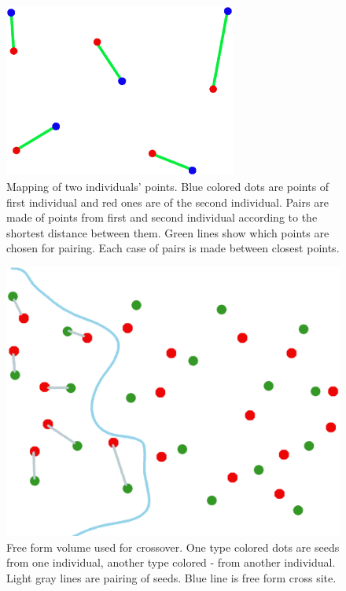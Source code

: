 \documentclass[12pt]{report}
\begin{document}
\begin{figure}
    \centering
    \includegraphics[width=3.0in]{individuals_map}
    \caption{Mapping of two individuals' points. Blue colored dots are points of first individual and red ones are of the second individual. Pairs are made of points from first and second individual according to the shortest distance between them. Green lines show which points are chosen for pairing. Each case of pairs is made between closest points.}
    \label{mappingindividuals}
\end{figure}

\begin{figure}
    \centering
    \includegraphics[width=5.0in]{3d_map}
    \caption{Free form volume used for crossover. One type colored dots are seeds from one individual, another type colored - from another individual. Light gray lines are pairing of seeds. Blue line is free form cross site.}
    \label{3d_map}
\end{figure}
\end{document}

